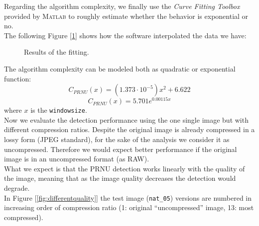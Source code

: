 \documentclass[a4paper, 12pt]{article}
\begin{document}
Regarding the algorithm complexity, we finally use the \textit{Curve Fitting Toolbox} provided by \textsc{Matlab} to roughly estimate whether the behavior is exponential or no.\\
The following Figure [\ref{fig:curvefitting}] shows how the software interpolated the data we have:
\begin{figure}[H]
	\centering
	\caption{Results of the fitting.}
	\label{fig:curvefitting}
\end{figure}

The algorithm complexity can be modeled both as quadratic or exponential function:
\begin{equation}
C_{PRNU}(x) = \left( 1.373\cdot 10^{-5} \right) x^2 + 6.622
\end{equation}
\begin{equation}
C_{PRNU}(x) = 5.701 e^{0.00115 x}
\end{equation}
where $x$ is the \texttt{windowsize}.\\

Now we evaluate the detection performance using the one single image but with different compression ratios. Despite the original image is already compressed in a lossy form (JPEG standard), for the sake of the analysis we consider it as uncompressed. Therefore we would expect better performance if the original image is in an uncompressed format (as RAW).\\
What we expect is that the PRNU detection works linearly with the quality of the image, meaning that as the image quality decreases the detection would degrade.\\
In Figure [\ref{fig:differentquality}] the test image (\texttt{nat\_05}) versions are numbered in increasing order of compression ratio (1: original ``uncompressed'' image, 13: most compressed). 
\end{document}
